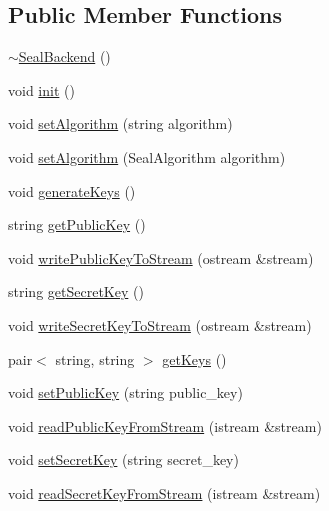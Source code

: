 \subsection*{Public Member Functions}
\begin{DoxyCompactItemize}
\item 
\mbox{\hyperlink{classhomomorphine_1_1_seal_backend_a7224092a19a3472a5143d16b80fb9775}{$\sim$\+Seal\+Backend}} ()
\item 
void \mbox{\hyperlink{classhomomorphine_1_1_seal_backend_a106556100ae5f2e9dadfa9fc64603d94}{init}} ()
\item 
void \mbox{\hyperlink{classhomomorphine_1_1_seal_backend_a46a336bca80c5450a1f3ea1125d0d0e8}{set\+Algorithm}} (string algorithm)
\item 
void \mbox{\hyperlink{classhomomorphine_1_1_seal_backend_aaf2100eb13b4434bc0136ff00578bb8d}{set\+Algorithm}} (Seal\+Algorithm algorithm)
\item 
void \mbox{\hyperlink{classhomomorphine_1_1_seal_backend_a1e2ed46b896d4a5b5d930ec7bcd3207b}{generate\+Keys}} ()
\item 
string \mbox{\hyperlink{classhomomorphine_1_1_seal_backend_aa2dce269303eaa73c62dbfacce66dc1a}{get\+Public\+Key}} ()
\item 
void \mbox{\hyperlink{classhomomorphine_1_1_seal_backend_af09735f0304cc28e6dc967938a4ad277}{write\+Public\+Key\+To\+Stream}} (ostream \&stream)
\item 
string \mbox{\hyperlink{classhomomorphine_1_1_seal_backend_a8ad57a68eb8a02d162ba439046565471}{get\+Secret\+Key}} ()
\item 
void \mbox{\hyperlink{classhomomorphine_1_1_seal_backend_ab3420695131ae4c2a3891917480ddacf}{write\+Secret\+Key\+To\+Stream}} (ostream \&stream)
\item 
pair$<$ string, string $>$ \mbox{\hyperlink{classhomomorphine_1_1_seal_backend_a30358e6405e2d1470468cf55aefb3f4d}{get\+Keys}} ()
\item 
void \mbox{\hyperlink{classhomomorphine_1_1_seal_backend_a6d34008acb06ff1d6743f9163fcd41fb}{set\+Public\+Key}} (string public\+\_\+key)
\item 
void \mbox{\hyperlink{classhomomorphine_1_1_seal_backend_a5bcb7f49667f2a2e095690fdec484b51}{read\+Public\+Key\+From\+Stream}} (istream \&stream)
\item 
void \mbox{\hyperlink{classhomomorphine_1_1_seal_backend_aa9fd3331b2c710e8fdfc3385bbf11eb5}{set\+Secret\+Key}} (string secret\+\_\+key)
\item 
void \mbox{\hyperlink{classhomomorphine_1_1_seal_backend_a5c1607bb712ff2776f4d4ca0c75b3e37}{read\+Secret\+Key\+From\+Stream}} (istream \&stream)

\end{DoxyCompactItemize}
